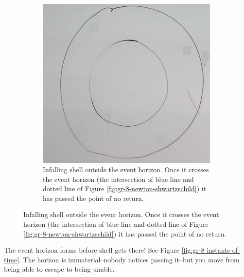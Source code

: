 \documentclass[]{article}
\begin{document}
{\begin{figure}[H]
\begin{center}
\begin{subfigure}[t]{0.45\textwidth}
			\caption{Infalling shell outside the event horizon. Once it crosses the event horizon (the intersection of blue line and dotted line of Figure \ref{fig:gr-8-newton-shwartzschild}) it has passed the point of no return.}\label{fig:gr-8-infalling-shell}
			\includegraphics[width=\textwidth]{gr-8-infalling-shell}
		\end{subfigure}
	\end{center}
\end{figure}

The event horizon forms before shell gets there! See Figure \ref{fig:gr-8-instants-of-time}. The horizon is immaterial--nobody notices passing it--but you move from being able to escape to being unable.

}
\end{document}
